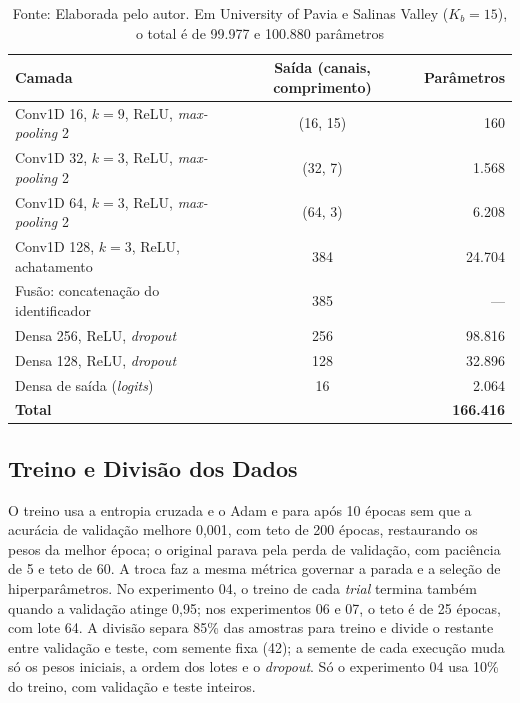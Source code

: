 \begin{table}[H]
    \centering
    \small
    \caption{Camadas da CNN 1D do projeto com fusão, em Indian Pines ($K_b = 30$)}
    \begin{tabular}{|l|c|r|}
        \hline
        \rowcolor[HTML]{C0C0C0}
        \textbf{Camada} & \textbf{Saída (canais, comprimento)} & \textbf{Parâmetros} \\
        \hline
        Conv1D 16, $k = 9$, ReLU, \textit{max-pooling} 2 & (16, 15) & 160 \\
        Conv1D 32, $k = 3$, ReLU, \textit{max-pooling} 2 & (32, 7) & 1.568 \\
        Conv1D 64, $k = 3$, ReLU, \textit{max-pooling} 2 & (64, 3) & 6.208 \\
        Conv1D 128, $k = 3$, ReLU, achatamento & 384 & 24.704 \\
        Fusão: concatenação do identificador & 385 & --- \\
        Densa 256, ReLU, \textit{dropout} & 256 & 98.816 \\
        Densa 128, ReLU, \textit{dropout} & 128 & 32.896 \\
        Densa de saída (\textit{logits}) & 16 & 2.064 \\
        \hline
        \textbf{Total} & & \textbf{166.416} \\
        \hline
    \end{tabular}
    \captionsetup{justification=raggedright}
    \caption*{Fonte: Elaborada pelo autor. Em University of Pavia e Salinas Valley ($K_b = 15$), o total é de 99.977 e 100.880 parâmetros}
    \label{tab:camadas}
\end{table}

\subsection{Treino e Divisão dos Dados}
\label{subsec:desTreino}

O treino usa a entropia cruzada e o Adam e para após 10 épocas sem que a acurácia de validação melhore 0,001, com teto de 200 épocas, restaurando os pesos da melhor época; o original parava pela perda de validação, com paciência de 5 e teto de 60. A troca faz a mesma métrica governar a parada e a seleção de hiperparâmetros. No experimento 04, o treino de cada \textit{trial} termina também quando a validação atinge 0,95; nos experimentos 06 e 07, o teto é de 25 épocas, com lote 64. A divisão separa 85\% das amostras para treino e divide o restante entre validação e teste, com semente fixa (42); a semente de cada execução muda só os pesos iniciais, a ordem dos lotes e o \textit{dropout}. Só o experimento 04 usa 10\% do treino, com validação e teste inteiros.

